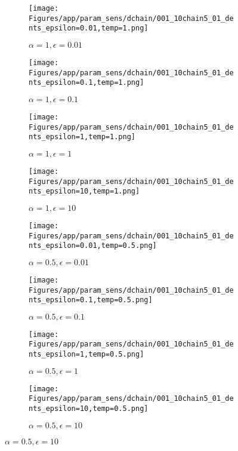 \documentclass{article}
\theoremstyle{plain}
\begin{document}
\begin{appendices}
\begin{figure}
                \begin{subfigure}[b]{0.24\textwidth}
                    \centering
                    \texttt{[image: Figures/app/param\_sens/dchain/001\_10chain5\_01\_dents\_epsilon=0.01,temp=1.png]}
                    \caption*{$\alpha=1,\epsilon=0.01$}
                \end{subfigure}
                \begin{subfigure}[b]{0.24\textwidth}
                    \centering
                    \texttt{[image: Figures/app/param\_sens/dchain/001\_10chain5\_01\_dents\_epsilon=0.1,temp=1.png]}
                    \caption*{$\alpha=1,\epsilon=0.1$}
                \end{subfigure}
                \begin{subfigure}[b]{0.24\textwidth}
                    \centering
                    \texttt{[image: Figures/app/param\_sens/dchain/001\_10chain5\_01\_dents\_epsilon=1,temp=1.png]}
                    \caption*{$\alpha=1,\epsilon=1$}
                \end{subfigure}
                \begin{subfigure}[b]{0.24\textwidth}
                    \centering
                    \texttt{[image: Figures/app/param\_sens/dchain/001\_10chain5\_01\_dents\_epsilon=10,temp=1.png]}
                    \caption*{$\alpha=1,\epsilon=10$}
                \end{subfigure}
                
                \begin{subfigure}[b]{0.24\textwidth}
                    \centering
                    \texttt{[image: Figures/app/param\_sens/dchain/001\_10chain5\_01\_dents\_epsilon=0.01,temp=0.5.png]}
                    \caption*{$\alpha=0.5,\epsilon=0.01$}
                \end{subfigure}
                \begin{subfigure}[b]{0.24\textwidth}
                    \centering
                    \texttt{[image: Figures/app/param\_sens/dchain/001\_10chain5\_01\_dents\_epsilon=0.1,temp=0.5.png]}
                    \caption*{$\alpha=0.5,\epsilon=0.1$}
                \end{subfigure}
                \begin{subfigure}[b]{0.24\textwidth}
                    \centering
                    \texttt{[image: Figures/app/param\_sens/dchain/001\_10chain5\_01\_dents\_epsilon=1,temp=0.5.png]}
                    \caption*{$\alpha=0.5,\epsilon=1$}
                \end{subfigure}
                \begin{subfigure}[b]{0.24\textwidth}
                    \centering
                    \texttt{[image: Figures/app/param\_sens/dchain/001\_10chain5\_01\_dents\_epsilon=10,temp=0.5.png]}
                    \caption*{$\alpha=0.5,\epsilon=10$}
                \end{subfigure}
                

\end{figure}
\end{appendices}
\end{document}
